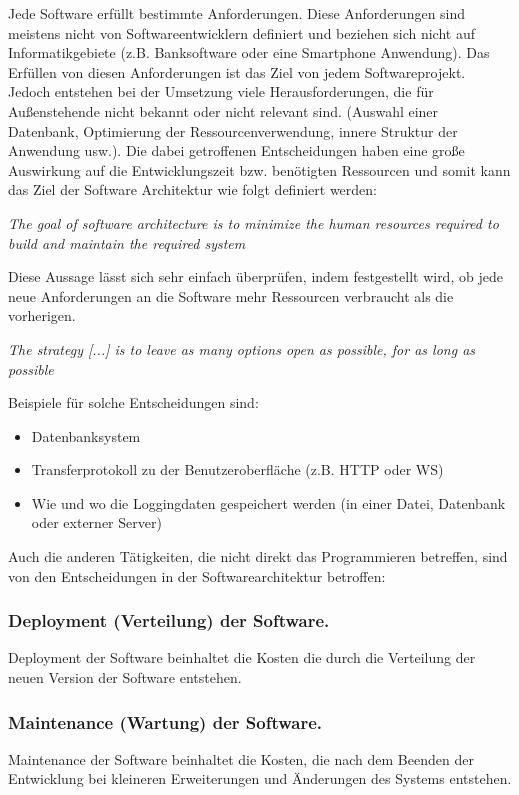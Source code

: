 Jede Software erfüllt bestimmte Anforderungen. 
Diese Anforderungen sind meistens nicht von Softwareentwicklern definiert und beziehen sich nicht auf Informatikgebiete 
    (z.B. Banksoftware oder eine Smartphone Anwendung). 
    Das Erfüllen von diesen Anforderungen ist das Ziel von jedem Softwareprojekt.
    Jedoch entstehen bei der Umsetzung viele Herausforderungen, die für Außenstehende nicht bekannt oder nicht relevant sind.
    (Auswahl einer Datenbank, Optimierung der Ressourcenverwendung, innere Struktur der Anwendung usw.). 
    Die dabei getroffenen Entscheidungen haben eine große Auswirkung auf die Entwicklungszeit bzw.
    benötigten Ressourcen und somit kann das Ziel der Software Architektur wie folgt definiert werden:

    \textit{The goal of software architecture is to minimize the human resources required
    to build and maintain the required system}\cite[5]{cleanArchitecture}

    Diese Aussage lässt sich sehr einfach überprüfen, indem festgestellt wird, 
    ob jede neue Anforderungen an die Software mehr Ressourcen verbraucht als die vorherigen.

    \textit{The strategy [...] is to leave as many options open as possible, for as long as possible}
    \cite[136]{cleanArchitecture}

    Beispiele für solche Entscheidungen sind:
    \begin{itemize}
        \item Datenbanksystem
        \item Transferprotokoll zu der Benutzeroberfläche (z.B. HTTP oder WS)
        \item Wie und wo die Loggingdaten gespeichert werden (in einer Datei, Datenbank oder externer Server)
    \end{itemize}

    \newpage
    Auch die anderen Tätigkeiten, die nicht direkt das Programmieren betreffen, 
    sind von den Entscheidungen in der Softwarearchitektur betroffen:
    \subsubsection*{Deployment (Verteilung) der Software.}

    Deployment der Software beinhaltet die Kosten die durch die Verteilung der neuen Version der Software entstehen.

    \subsubsection*{Maintenance (Wartung) der Software.}

    Maintenance der Software beinhaltet die Kosten, die nach dem Beenden der Entwicklung bei kleineren Erweiterungen und Änderungen des Systems entstehen.
\\


